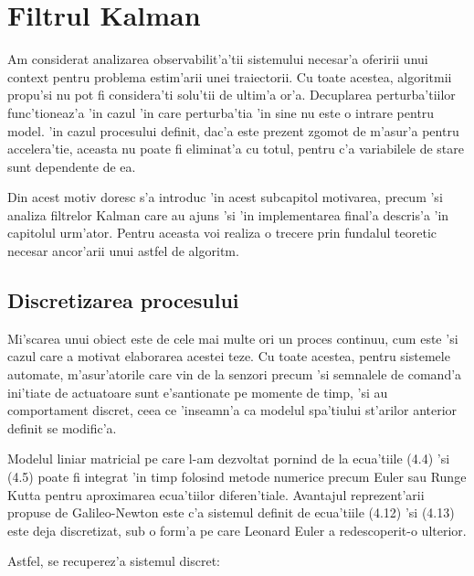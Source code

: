 \documentclass[12pt,a4paper,twoside]{report}
\begin{document}
\section{Filtrul Kalman}

Am considerat analizarea observabilit'a'tii sistemului necesar'a oferirii unui context pentru problema estim'arii unei traiectorii. Cu toate acestea, algoritmii propu'si nu pot fi considera'ti solu'tii de ultim'a or'a. Decuplarea perturba'tiilor func'tioneaz'a 'in cazul 'in care perturba'tia 'in sine nu este o intrare pentru model. 'in cazul procesului definit, dac'a este prezent zgomot de m'asur'a pentru accelera'tie, aceasta nu poate fi eliminat'a cu totul, pentru c'a variabilele de stare sunt dependente de ea. 

\vspace{5px}

Din acest motiv doresc s'a introduc 'in acest subcapitol motivarea, precum 'si analiza filtrelor Kalman care au ajuns 'si 'in implementarea final'a descris'a 'in capitolul urm'ator. Pentru aceasta voi realiza o trecere prin fundalul teoretic necesar ancor'arii unui astfel de algoritm.

\subsection{Discretizarea procesului}

Mi'scarea unui obiect este de cele mai multe ori un proces continuu, cum este 'si cazul care a motivat elaborarea acestei teze. Cu toate acestea, pentru sistemele automate, m'asur'atorile care vin de la senzori precum 'si semnalele de comand'a ini'tiate de actuatoare sunt e'santionate pe momente de timp, 'si au comportament discret, ceea ce 'inseamn'a ca modelul spa'tiului st'arilor anterior definit se modific'a.

\vspace{5px}

Modelul liniar matricial pe care l-am dezvoltat pornind de la ecua'tiile (4.4) 'si (4.5) poate fi integrat 'in timp folosind metode numerice precum Euler sau Runge Kutta \cite{RK4} pentru aproximarea ecua'tiilor diferen'tiale. Avantajul reprezent'arii propuse de Galileo-Newton este c'a sistemul definit de ecua'tiile (4.12) 'si (4.13) este deja discretizat, sub o form'a pe care Leonard Euler a redescoperit-o ulterior.

\vspace{5px}

Astfel, se recuperez'a sistemul discret: 
\end{document}
